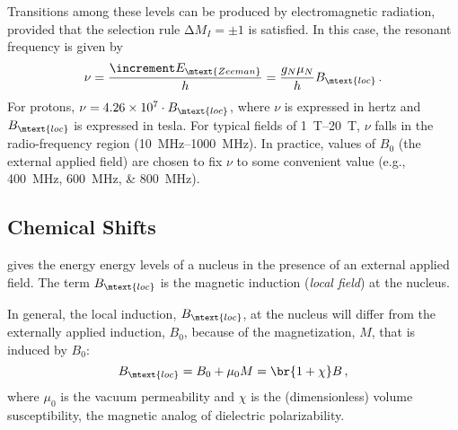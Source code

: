 Transitions among these levels can be produced by electromagnetic radiation, provided that the selection rule \( \increment M_I = \pm 1 \) is satisfied. 
In this case, the resonant frequency is given by 
\begin{equation}
	\nu = \frac{\increment E_\mtext{Zeeman}}{h} = \frac{g_N\mu_N}{h} B_\mtext{loc}\, .
	\label{eq:res_freq}
\end{equation}
For protons, \( \nu = \num{4.26e7} \cdot B_\mtext{loc} \), where \( \nu \) is expressed in hertz and \( B_\mtext{loc} \) is expressed in tesla. For typical fields of \SIrange{1}{20}{\tesla}, \( \nu \) falls in the radio-frequency region (\SIrange{10}{1000}{\MHz}). 
In practice, values of \( B_0 \) (the external applied field) are chosen to fix \( \nu \) to some convenient value (e.g., \SIlist{400;600;800}{\MHz}). 


\subsection{Chemical Shifts} %
\label{sub:chemical_shifts}

 gives the energy energy levels of a nucleus in the presence of an external applied field. 
The term \( B_\mtext{loc} \) is the magnetic induction (\emph{local field}) at the nucleus. 

In general, the local induction, \( B_\mtext{loc} \), at the nucleus will differ from the externally applied induction, \( B_0 \), because of the magnetization, \( M \), that is induced by \( B_0 \):
\begin{equation}
	B_\mtext{loc} = B_0 + \mu_0 M = \br{1 + \chi} B \, ,
	\label{eq:b_loc}
\end{equation}
where \( \mu_0 \) is the vacuum permeability and \( \chi \) is the (dimensionless) volume susceptibility, the magnetic analog of dielectric polarizability. 


